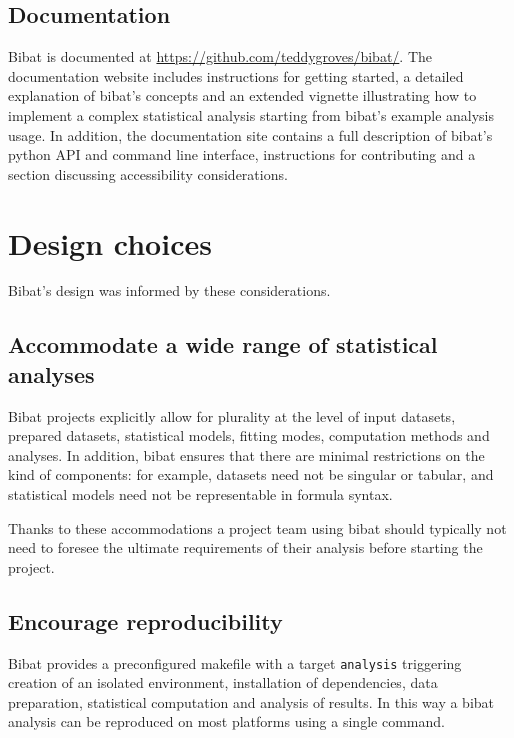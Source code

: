 \documentclass[
  letterpaper,
  DIV=11,
  numbers=noendperiod]{scrartcl}
\begin{document}
\subsection{Documentation}\label{documentation}

Bibat is documented at \url{https://github.com/teddygroves/bibat/}. The
documentation website includes instructions for getting started, a
detailed explanation of bibat's concepts and an extended vignette
illustrating how to implement a complex statistical analysis starting
from bibat's example analysis usage. In addition, the documentation site
contains a full description of bibat's python API and command line
interface, instructions for contributing and a section discussing
accessibility considerations.

\section{Design choices}\label{design-choices}

Bibat's design was informed by these considerations.

\subsection{Accommodate a wide range of statistical
analyses}\label{accommodate-a-wide-range-of-statistical-analyses}

Bibat projects explicitly allow for plurality at the level of input
datasets, prepared datasets, statistical models, fitting modes,
computation methods and analyses. In addition, bibat ensures that there
are minimal restrictions on the kind of components: for example,
datasets need not be singular or tabular, and statistical models need
not be representable in formula syntax.

Thanks to these accommodations a project team using bibat should
typically not need to foresee the ultimate requirements of their
analysis before starting the project.

\subsection{Encourage reproducibility}\label{encourage-reproducibility}

Bibat provides a preconfigured makefile with a target \texttt{analysis}
triggering creation of an isolated environment, installation of
dependencies, data preparation, statistical computation and analysis of
results. In this way a bibat analysis can be reproduced on most
platforms using a single command.
\end{document}
